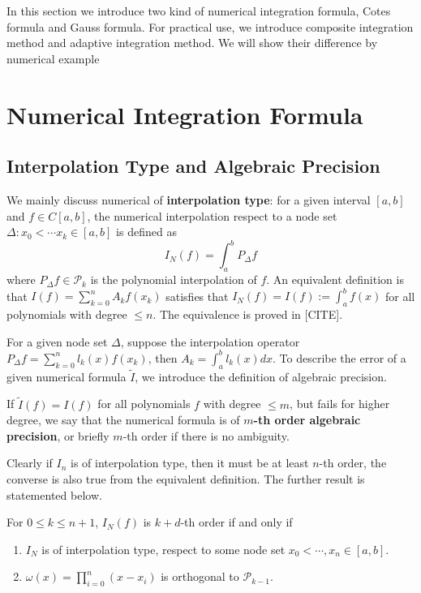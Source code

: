 \documentclass{article}
\begin{document}
	\maketitle
	\thispagestyle{fancy}
	\tableofcontents
	
	\section*{}
In this section we introduce two kind of numerical integration formula, Cotes formula and Gauss formula. For practical use, we introduce composite integration method and adaptive integration method. We will show their difference by numerical example 



\section{Numerical Integration Formula}
\subsection{Interpolation Type and Algebraic Precision}
We mainly discuss numerical of\textbf{ interpolation type}: for a given interval $[a,b]$ and $f \in C[a,b]$, the numerical interpolation respect to a node set $\Delta: x_0 < \cdots x_k  \in [a,b]$ is defined as 
$$I_N(f) = \int_{a}^b P_{\Delta}f$$
where $P_{\Delta}f \in \mathcal P_{k}$ is the polynomial interpolation of $f$. An equivalent definition is that $I(f) = \sum_{k=0}^n A_kf(x_k)$ satisfies that $I_N(f) = I(f):=\int_{a}^{b} f(x) $ for all polynomials with degree $\le n$. The equivalence is proved in [CITE]. 

For a given node set $\Delta$, suppose the interpolation operator $P_{\Delta}f = \sum_{k=0}^n l_k(x)f(x_k)$, then $A_k = \int_a^b l_k(x) dx$. 
To describe the error of a given numerical formula $\tilde I$, we introduce the definition of algebraic precision. 

\begin{definition}
	If $\tilde I (f) = I(f)$ for all polynomials $f$ with degree $\le m$, but fails for higher degree, we say that the numerical formula is of \textbf{$m$-th order algebraic precision}, or briefly $m$-th order if there is no ambiguity.
\end{definition}

Clearly if $I_n$ is of interpolation type, then it must be at least $n$-th order, the converse is also true from the equivalent definition. The further result is statemented below.
\begin{proposition}
	For $0\le k \le n+1$, $I_N(f)$ is $k+d$-th order if and only if 
	\begin{enumerate}
		\item $I_N$ is of interpolation type, respect to some node set $x_0<\cdots, x_n \in [a,b]$.
		\item $\omega(x) = \prod_{i=0}^n (x-x_i)$ is orthogonal to $\mathcal P_{k-1}$.
	\end{enumerate}
\end{proposition}
\end{document}
